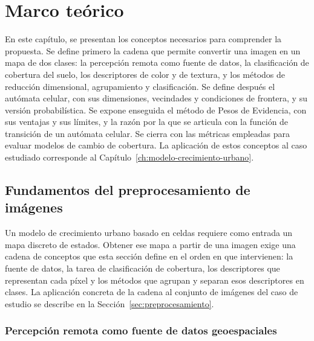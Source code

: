 \graphicspath{{figures/}{../figures/}}

\chapter{Marco teórico}
\label{ch:marco-teorico}

\begin{resumen}
En este capítulo, se presentan los conceptos necesarios para comprender la propuesta. Se define primero la cadena que permite convertir una imagen en un mapa de dos clases: la percepción remota como fuente de datos, la clasificación de cobertura del suelo, los descriptores de color y de textura, y los métodos de reducción dimensional, agrupamiento y clasificación. Se define después el autómata celular, con sus dimensiones, vecindades y condiciones de frontera, y su versión probabilística. Se expone enseguida el método de Pesos de Evidencia, con sus ventajas y sus límites, y la razón por la que se articula con la función de transición de un autómata celular. Se cierra con las métricas empleadas para evaluar modelos de cambio de cobertura. La aplicación de estos conceptos al caso estudiado corresponde al Capítulo~\ref{ch:modelo-crecimiento-urbano}.
\end{resumen}

\section{Fundamentos del preprocesamiento de imágenes}
\label{sec:preprocesamiento-datos}

Un modelo de crecimiento urbano basado en celdas requiere como entrada un mapa discreto de estados. Obtener ese mapa a partir de una imagen exige una cadena de conceptos que esta sección define en el orden en que intervienen: la fuente de datos, la tarea de clasificación de cobertura, los descriptores que representan cada píxel y los métodos que agrupan y separan esos descriptores en clases. La aplicación concreta de la cadena al conjunto de imágenes del caso de estudio se describe en la Sección~\ref{sec:preprocesamiento}.

\subsection{Percepción remota como fuente de datos geoespaciales}

